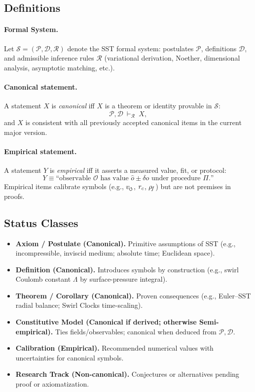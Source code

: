 \documentclass[11pt]{article}
\begin{document}
    \subsection*{Definitions}
    \paragraph{Formal System.}
    Let \(\mathcal{S} = (\mathcal{P},\mathcal{D},\mathcal{R})\) denote the SST formal system:
    postulates \(\mathcal{P}\), definitions \(\mathcal{D}\), and admissible inference rules \(\mathcal{R}\)
    (variational derivation, Noether, dimensional analysis, asymptotic matching, etc.).

    \paragraph{Canonical statement.}
    A statement \(X\) is \emph{canonical} iff \(X\) is a theorem or identity provable in \(\mathcal{S}\):
    \[
        \mathcal{P},\mathcal{D}\ \vdash_{\mathcal{R}}\ X,
    \]
    and \(X\) is consistent with all previously accepted canonical items in the current major version.

    \paragraph{Empirical statement.}
    A statement \(Y\) is \emph{empirical} iff it asserts a measured value, fit, or protocol:
    \[
        Y \equiv \text{“observable } \mathcal{O} \text{ has value } \hat{o} \pm \delta o \text{ under procedure } \Pi\text{.”}
    \]
    Empirical items calibrate symbols (e.g., $\vscore$, $r_c$, $\rho_{\!f}$) but are not premises in proofs.

    \subsection*{Status Classes}
    \begin{itemize}
        \item \textbf{Axiom / Postulate (Canonical).} Primitive assumptions of SST (e.g., incompressible, inviscid medium; absolute time; Euclidean space).
        \item \textbf{Definition (Canonical).} Introduces symbols by construction (e.g., swirl Coulomb constant \(\Lambda\) by surface-pressure integral).
        \item \textbf{Theorem / Corollary (Canonical).} Proven consequences (e.g., Euler–SST radial balance; Swirl Clocks time-scaling).
        \item \textbf{Constitutive Model (Canonical if derived; otherwise Semi-empirical).} Ties fields/observables; canonical when deduced from \(\mathcal{P},\mathcal{D}\).
        \item \textbf{Calibration (Empirical).} Recommended numerical values with uncertainties for canonical symbols.
        \item \textbf{Research Track (Non-canonical).} Conjectures or alternatives pending proof or axiomatization.
    \end{itemize}
\end{document}
